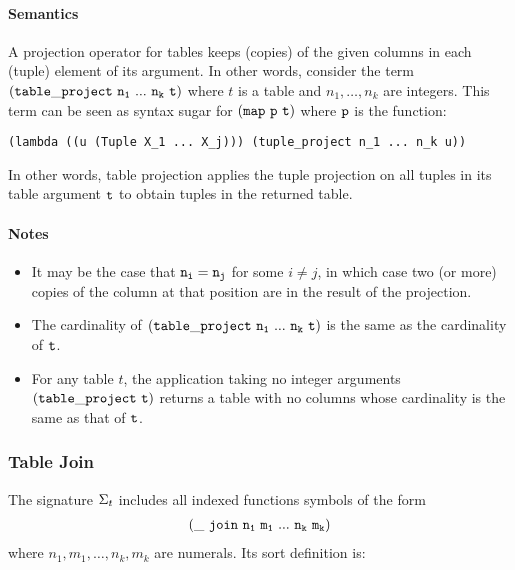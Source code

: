 \documentclass[english,a4paper,10pt]{article}
\begin{document}
\paragraph{Semantics}

A projection operator for tables keeps (copies) of the given columns
in each (tuple) element of its argument.
In other words,
consider the term $\syntax{(table\_project\ n_1\ ...\ n_k\ t)}$
where $t$ is a table and $n_1, \ldots, n_k$ are integers.
This term
can be seen as syntax sugar for ${\tt (map\ p\ t)}$ where ${\tt p}$
is the function:
\begin{verbatim}
(lambda ((u (Tuple X_1 ... X_j))) (tuple_project n_1 ... n_k u))
\end{verbatim}
In other words, table projection
applies the tuple projection on all tuples in its table argument ${\tt t}$
to obtain tuples in the returned table.

\paragraph{Notes}
\begin{itemize}
\item
It may be the case that ${\tt n_i} = {\tt n_j}$ for some $i \neq j$,
in which case two (or more) copies of the column at that position
are in the result of the projection.
\item
The cardinality of $\syntax{(table\_project\ n_1\ ...\ n_k\ t)}$ is
the same as the cardinality of ${\tt t}$.
\item
For any table $t$,
the application taking no integer arguments ${\tt (table\_project\ t)}$ 
returns a table with no columns whose cardinality is the same as that of ${\tt t}$.
\end{itemize}

\subsubsection{Table Join}
The signature $\Sigma_{t}$ includes 
all indexed functions symbols of the form
\begin{align*}
{\tt  
(\_\ join\ n_1\ m_1\ ...\ n_k\ m_k)
}
\end{align*}
where $n_1, m_1, \ldots, n_k, m_k$ are numerals.
Its sort definition is:
\end{document}
